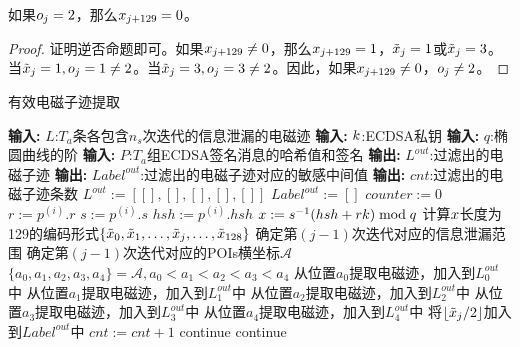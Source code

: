 {	\begin{corollary}\label{cor:lowbitinfo}
		如果$o_j=2$，那么$x_{j+129}=0$。
	\end{corollary}
	\begin{proof}
		证明逆否命题即可。如果$x_{j+129}\neq0$，那么$x_{j+129}=1$，$\tilde {x}_j=1$或$\tilde {x}_j=3$。当$\tilde {x}_j=1,o_j=1\neq2$。当$\tilde {x}_j=3,o_j=3\neq2$。因此，如果$x_{j+129}\neq0$，$o_j\neq2$。
	\end{proof}
	
			
	
	\begin{breakablealgorithm}
		\caption{有效电磁子迹提取}\label{alg:filter}
		\begin{algorithmic}[1]
			\Statex \textbf{输入:} $L$:$T_a$条各包含$n_s$次迭代的信息泄漏的电磁迹
			\Statex \textbf{输入:} $k$:ECDSA私钥
			\Statex \textbf{输入:} $q$:椭圆曲线的阶
			\Statex \textbf{输入:} $P$:$T_a$组ECDSA签名消息的哈希值和签名
			\Statex \textbf{输出:} $L^{out}$:过滤出的电磁子迹
			\Statex \textbf{输出:} $Label^{out}$:过滤出的电磁子迹对应的敏感中间值
			\Statex \textbf{输出:} $cnt$:过滤出的电磁子迹条数
			\State $L^{out}:=\left[ [],[],[],[],[]\right] $
			\State $Label^{out}:=[]$
			\State $counter:=0$
				\State $r:=p^{(i)}.r$
				\State $s:=p^{(i)}.s$
				\State $hsh:=p^{(i)}.hsh$
				\State $x:=s^{-1}(hsh+rk)\bmod q$
				\State 计算$x$长度为129的编码形式$\left\{\tilde{x}_0,\tilde{x}_1,\dots,\tilde{x}_j,\dots, \tilde{x}_{128}\right\}$
						\State 确定第$(j-1)$次迭代对应的信息泄漏范围
						\State 确定第$(j-1)$次迭代对应的POIs横坐标$\mathcal A$
							\State $\{a_0,a_1,a_2,a_3,a_4\}=\mathcal A,a_0<a_1<a_2<a_3<a_4$
							\State 从位置$a_0$提取电磁迹，加入到$L_0^{out}$中
							\State 从位置$a_1$提取电磁迹，加入到$L_1^{out}$中
							\State 从位置$a_2$提取电磁迹，加入到$L_2^{out}$中
							\State 从位置$a_3$提取电磁迹，加入到$L_3^{out}$中
							\State 从位置$a_4$提取电磁迹，加入到$L_4^{out}$中
							\State 将$\left\lfloor\tilde{x}_j/2\right\rfloor$加入到$Label^{out}$中
							\State $cnt:=cnt+1$
						\Else
							\State continue
						\EndIf
					\Else
						\State continue
					\EndIf
				\EndFor
			\EndFor
		\end{algorithmic}
	\end{breakablealgorithm}

}
